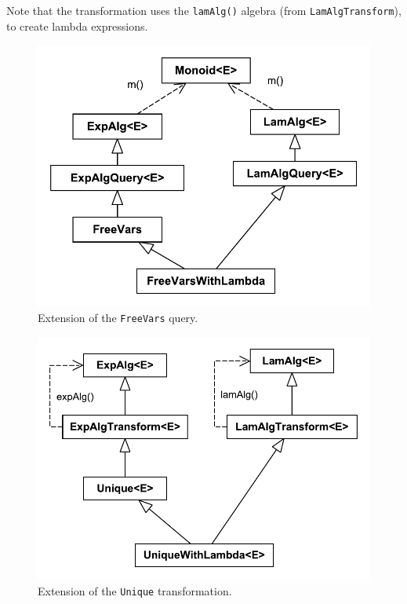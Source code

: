 
\noindent Note that the transformation uses the \lstinline{lamAlg()} algebra (from \lstinline{LamAlgTransform}),
to create lambda expressions.

\begin{figure}[t]
  \centering
  \nocaptionrule
  \includegraphics[width=0.9\linewidth]{extendQuery}
  \caption{Extension of the \lstinline{FreeVars} query.}
  \label{FIG:extensionQuery}
\end{figure}


\begin{figure}[h]
  \centering
  \nocaptionrule
  \includegraphics[width=0.9\linewidth]{extendTransform}
  \caption{Extension of the \lstinline{Unique} transformation.}
  \label{FIG:extensionTrafo}
\end{figure}


